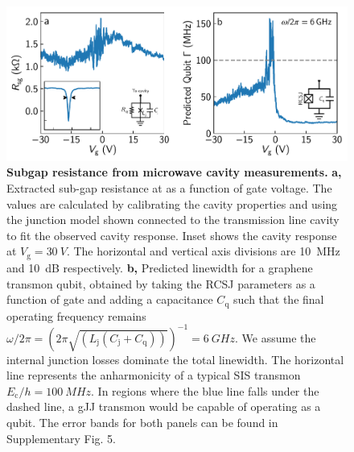 \documentclass[preprint,
  onecolumn,
  notitlepage,
  amsmath,amssymb,
  aip,
  apl,
]{revtex4-1}
\begin{document}
\begin{figure}[thb]
	\centering
	\includegraphics[width=\linewidth]{figs/fig4_final}
	\caption[]{\textbf{Subgap resistance from microwave cavity measurements.} 
		\textbf{a,}
		Extracted sub-gap resistance at as a function of gate voltage.
		The values are calculated by calibrating the cavity properties and using the junction model shown connected to the transmission line cavity to fit the observed cavity response.
		Inset shows the cavity response at $V_\textrm{g}=\SI{30}{V}$.
		The horizontal and vertical axis divisions are \SI{10}{MHz} and \SI{10}{dB} respectively.
		\textbf{b,}
		Predicted linewidth for a graphene transmon qubit, obtained by taking the RCSJ parameters as a function of gate and adding a capacitance $C_\textrm{q}$ such that the final operating frequency remains $\omega/2\pi = \left(2\pi\sqrt{(L_\textrm{j}(C_\textrm{j}+C_\textrm{q}))}\right)^{-1} = \SI{6}{GHz}$.
		We assume the internal junction losses dominate the total linewidth.
		The horizontal line represents the anharmonicity of a typical SIS transmon $E_\textrm{c}/h=\SI{100}{MHz}$.
		In regions where the blue line falls under the dashed line, a gJJ transmon would be capable of operating as a qubit.
		The error bands for both panels can be found in Supplementary Fig. 5.
	}
	\label{fig:figure4}
\end{figure}


\cleardoublepage




\makeatletter
\renewcommand*{\fnum@figure}{{\normalfont Supplementary Figure~\thefigure}}
\renewcommand*{\fnum@table}{{\normalfont Supplementary Table~\thetable}}
\makeatother
\renewcommand{\thesection}{Supplementary Note \arabic{section}}
\renewcommand{\bibsection}{\subsection*{SUPPLEMENTARY REFERENCES}}
\setcounter{section}{0}
\setcounter{figure}{0}
\end{document}
